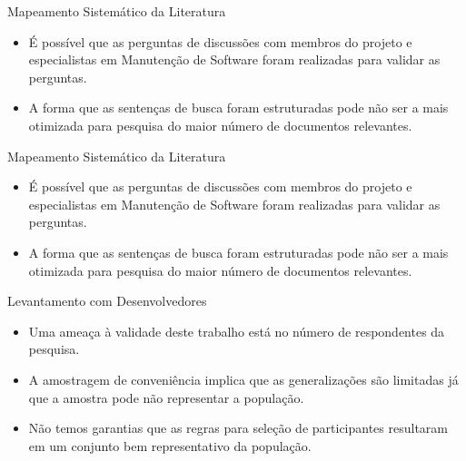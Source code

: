 \documentclass[t,14pt,mathserif]{beamer}
\begin{document}
\begin{frame}{Mapeamento Sistemático da Literatura}
    \begin{itemize}
        \item É possível que as perguntas de discussões com membros do projeto e
            especialistas em Manutenção de Software foram realizadas para
            validar as perguntas.

        \item A forma que as sentenças de busca foram estruturadas pode não ser
            a mais otimizada para pesquisa do maior número de documentos
            relevantes.
    \end{itemize}
\end{frame}

\begin{frame}{Mapeamento Sistemático da Literatura}
    \begin{itemize}

        \item É possível que as perguntas de discussões com membros do projeto e
            especialistas em Manutenção de Software foram realizadas para
            validar as perguntas.

        \item A forma que as sentenças de busca foram estruturadas pode não ser
            a mais otimizada para pesquisa do maior número de documentos
            relevantes.
    \end{itemize}
\end{frame}

\begin{frame}{Levantamento com Desenvolvedores}

    \begin{itemize}
        \item Uma ameaça à validade deste trabalho está no número de
            respondentes da pesquisa.
        \item A amostragem de conveniência implica que as generalizações são
            limitadas já que a amostra pode não representar a população.
        \item Não temos garantias que as regras para seleção de participantes
             resultaram em um conjunto bem representativo da população.
     \end{itemize}

\end{frame}
\end{document}
